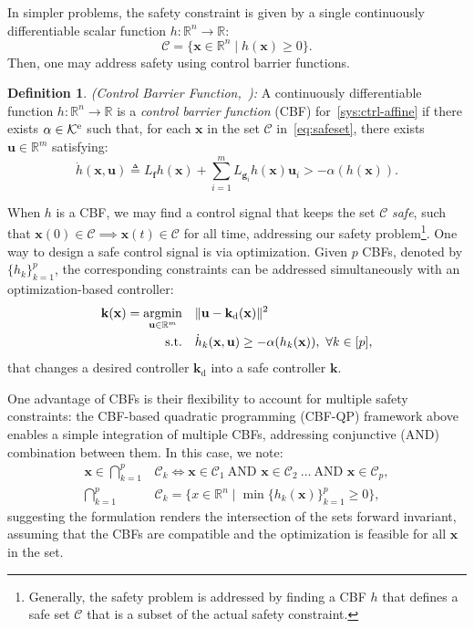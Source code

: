 \documentclass[journal,twoside,web]{ieeecolor}
\newcommand{\real}{\mathbb{R}}
\newcommand{\until}[1]{[#1]}
\newcommand{\map}[3]{#1:#2 \rightarrow #3}
\newcommand{\longthmtitle}[1]{\mbox{}{\textit{(#1):}}}
\newcommand{\setdefb}[2]{\big\{#1 \; | \; #2\big\}}
\newcommand{\Cc}{\mathcal{C}}
\newcommand{\Kc}{\mathcal{K}}
\newcommand{\Ke}{\Kc^{\rm e}}
\newcommand{\defeq}{\triangleq}
\theoremstyle{definition}
\newtheorem{definition}{Definition}
\renewcommand{\bf}{\mathbf{f}} %
\newcommand{\bg}{\mathbf{g}}
\newcommand{\bk}{\mathbf{k}}
\newcommand{\bu}{\mathbf{u}}
\newcommand{\bx}{\mathbf{x}}
\newcommand{\des}{{\operatorname{d}}}
\DeclareMathOperator*{\argmin}{argmin}
\begin{document}
In simpler problems, the safety constraint is given by a single continuously differentiable scalar function ${\map{h}{\real^n}{\real}}$: 
\begin{equation}\label{eq:safeset}
    \Cc = \setdefb{\bx\in\real^n}{h(\bx)\geq 0}.    
\end{equation}
Then, one may address safety using control barrier functions.
\begin{definition}\longthmtitle{Control Barrier Function,~\cite{ADA-XX-JWG-PT:17}}
    A continuously differentiable function $\map{h}{\real^n}{\real}$ is a \textit{control barrier function} (CBF) for~\eqref{sys:ctrl-affine} if there exists $\alpha\in\Ke$ such that, for each $\bx$ in the set $\Cc$ in~\eqref{eq:safeset}, there exists $\bu\in\real^m$ satisfying:
   \begin{equation}\label{eq:CBF}
   \dot h(\bx,\bu) \defeq L_\bf h(\bx) + \sum_{i=1}^m L_{\bg_i}h(\bx) \bu_i
   > -\alpha(h(\bx)).
   \end{equation}
\end{definition}
When $h$ is a CBF, we may find a control signal that keeps the set $\Cc$ \textit{safe}, such that ${\bx(0) \in \Cc \implies \bx(t) \in \Cc}$ for all time, addressing our safety problem\footnote{Generally, the safety problem is addressed by finding a CBF $h$ that defines a safe set $\Cc$ that is a subset of the actual safety constraint.
}.
One way to design a safe control signal is via optimization.
Given $p$ CBFs, denoted by $\{h_k\}_{k=1}^p$, the corresponding constraints can be addressed simultaneously with an optimization-based controller:
\begin{align}\label{eq:CBF-QP}
    \bk(\bx)  =\argmin_{\bu\in\real^m} \quad & \|\bu-\bk_\des(\bx)\|^2                                                                  \\
             \textup{s.t.} \quad & \dot h_k(\bx,\bu) \geq -\alpha(h_k(\bx)),~\forall k\in\until{p}, \nonumber
\end{align}
that changes a desired controller $\bk_\des$ into a safe controller $\bk$.

One advantage of CBFs is their flexibility to account for multiple safety constraints: the CBF-based quadratic programming (CBF-QP) framework above enables a simple integration of multiple CBFs, addressing conjunctive (AND) combination between them.
In this case, we note:  
\begin{equation} \label{eq:cbf_and}
\begin{aligned}
    \!\!\!\bx \!\in\! {\textstyle \bigcap_{k=1}^{p}} & \Cc_k \!\iff\! \bx \!\in\! \Cc_1\ \text{AND } \bx \!\in\! \Cc_2\ \ldots\ \text{AND } \bx \!\in\! \Cc_p, \\
    {\textstyle \bigcap_{k=1}^{p}} & \Cc_k = \setdefb{x \in \real^n}{\min\{h_k(\bx)\}_{k=1}^p \geq 0},
\end{aligned}
\end{equation}
suggesting the formulation renders the intersection of the sets forward invariant, assuming that the CBFs are compatible and the optimization is feasible for all $\bx$ in the set.
\end{document}
